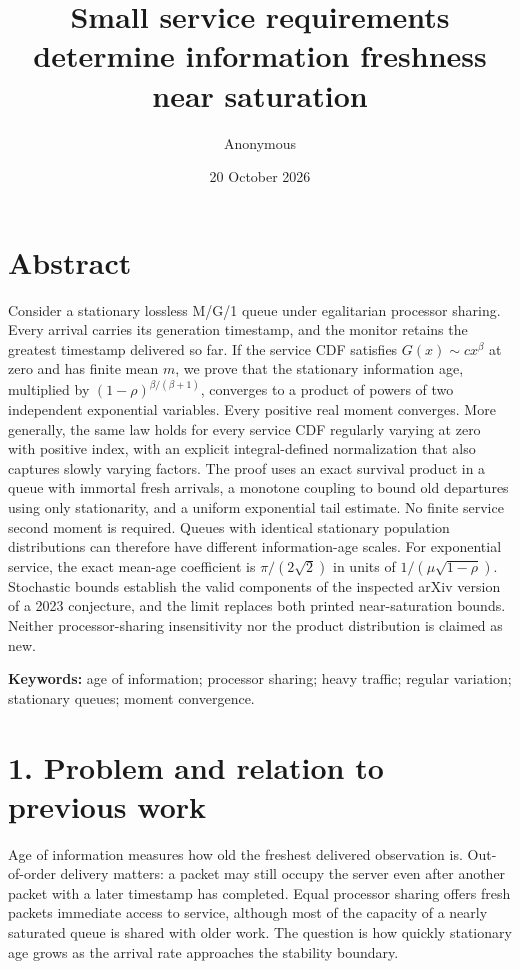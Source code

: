 \documentclass[
  11pt,
  a4paper,
]{scrartcl}
\title{Small service requirements determine information freshness near
saturation}
\author{Anonymous}
\date{20 October 2026}
\begin{document}
\maketitle

\section{Abstract}\label{abstract}

Consider a stationary lossless M/G/1 queue under egalitarian processor
sharing. Every arrival carries its generation timestamp, and the monitor
retains the greatest timestamp delivered so far. If the service CDF
satisfies \(G(x)\sim cx^\beta\) at zero and has finite mean \(m\), we
prove that the stationary information age, multiplied by
\((1-\rho)^{\beta/(\beta+1)}\), converges to a product of powers of two
independent exponential variables. Every positive real moment converges.
More generally, the same law holds for every service CDF regularly
varying at zero with positive index, with an explicit integral-defined
normalization that also captures slowly varying factors. The proof uses
an exact survival product in a queue with immortal fresh arrivals, a
monotone coupling to bound old departures using only stationarity, and a
uniform exponential tail estimate. No finite service second moment is
required. Queues with identical stationary population distributions can
therefore have different information-age scales. For exponential
service, the exact mean-age coefficient is \(\pi/(2\sqrt2)\) in units of
\(1/(\mu\sqrt{1-\rho})\). Stochastic bounds establish the valid
components of the inspected arXiv version of a 2023 conjecture, and the
limit replaces both printed near-saturation bounds. Neither
processor-sharing insensitivity nor the product distribution is claimed
as new.

\textbf{Keywords:} age of information; processor sharing; heavy traffic;
regular variation; stationary queues; moment convergence.

\section{1. Problem and relation to previous
work}\label{problem-and-relation-to-previous-work}

Age of information measures how old the freshest delivered observation
is. Out-of-order delivery matters: a packet may still occupy the server
even after another packet with a later timestamp has completed. Equal
processor sharing offers fresh packets immediate access to service,
although most of the capacity of a nearly saturated queue is shared with
older work. The question is how quickly stationary age grows as the
arrival rate approaches the stability boundary.
\end{document}
